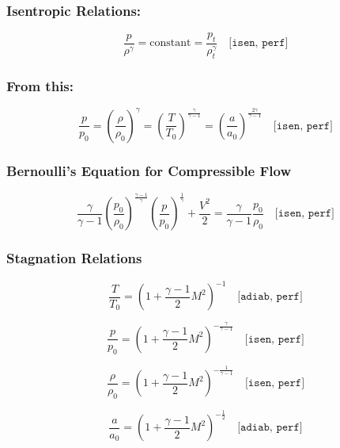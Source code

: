 \subsubsection*{Isentropic Relations:}

\begin{equation*}
	\frac{p}{\rho^\gamma} = \text{constant} = \frac{p_t}{\rho_t^\gamma}
	\quad \texttt{[isen, perf]}
\end{equation*}

\subsubsection*{From this:}

\begin{equation*}
	\frac{p}{p_0} = \left( \frac{\rho}{\rho_0} \right)^\gamma = \left( \frac{T}{T_0} \right)^{\frac{\gamma}{\gamma - 1}} = \left( \frac{a}{a_0} \right)^{\frac{2\gamma}{\gamma - 1}}
	\quad \texttt{[isen, perf]}
\end{equation*}

\subsubsection*{Bernoulli's Equation for Compressible Flow}

\begin{equation*}
	\frac{\gamma}{\gamma - 1} \left( \frac{p_0}{\rho_0} \right)^{\frac{\gamma - 1}{\gamma}} \left( \frac{p}{p_0} \right)^{\frac{1}{\gamma}} + \frac{V^2}{2} = \frac{\gamma}{\gamma - 1} \frac{p_0}{\rho_0} 
	\quad \texttt{[isen, perf]}
\end{equation*}

\subsubsection*{Stagnation Relations}

\begin{equation*}
	\frac{T}{T_0} = \left( 1 + \frac{\gamma - 1}{2} M^2 \right)^{-1}
	\quad \texttt{[adiab, perf]}
\end{equation*}

\begin{equation*}
	\frac{p}{p_0} = \left( 1 + \frac{\gamma - 1}{2} M^2 \right)^{-\frac{\gamma}{\gamma - 1}}
	\quad \texttt{[isen, perf]}
\end{equation*}

\begin{equation*}
	\frac{\rho}{\rho_0} = \left( 1 + \frac{\gamma - 1}{2} M^2 \right)^{-\frac{1}{\gamma - 1}}
	\quad \texttt{[isen, perf]}
\end{equation*}

\begin{equation*}
	\frac{a}{a_0} = \left( 1 + \frac{\gamma - 1}{2} M^2 \right)^{-\frac{1}{2}}
	\quad \texttt{[adiab, perf]}
\end{equation*}

\blankpage
